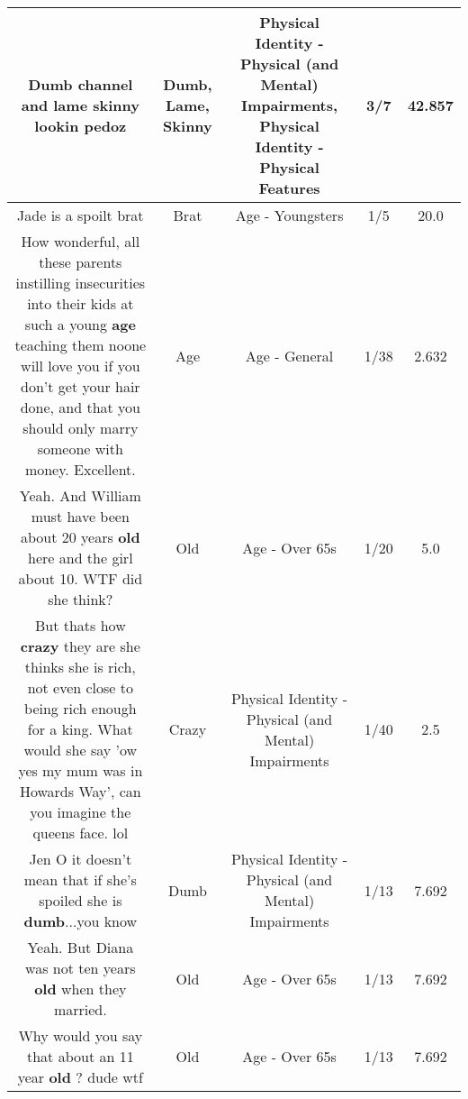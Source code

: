 \documentclass[11pt]{article}
\newlength\mylength
\begin{document}
\begin{center}
\begin{longtable}{|C{.65\mylength}|C{.30\mylength}|C{.12\mylength}|C{.12\mylength}|C{.12\mylength}|}
  \small Dumb channel and \textbf{lame} \textbf{skinny} lookin pedoz\normalsize   & Dumb, Lame, Skinny & Physical Identity - Physical (and Mental) Impairments, Physical Identity - Physical Features & 3/7 & 42.857 \\  \hline
  \small Jade is a spoilt  brat\normalsize   & Brat & Age - Youngsters & 1/5 & 20.0 \\  \hline
  \small How wonderful, all these parents instilling insecurities into their kids at such a young \textbf{age} teaching them noone will love you if you don't get your hair done, and that you should only marry someone with money. Excellent.\normalsize   & Age & Age - General & 1/38 & 2.632 \\  \hline
  \small Yeah. And William must have been about 20 years \textbf{old} here and the girl about 10. WTF did she think?\normalsize   & Old & Age - Over 65s & 1/20 & 5.0 \\  \hline
  \small But thats how \textbf{crazy} they are she thinks she is rich, not even close to being rich enough for a king. What would she say 'ow yes my mum was in Howards Way', can you imagine the queens face. lol\normalsize   & Crazy & Physical Identity - Physical (and Mental) Impairments & 1/40 & 2.5 \\  \hline
  \small Jen O it doesn't mean that if she's spoiled she is \textbf{dumb}...you know\normalsize   & Dumb & Physical Identity - Physical (and Mental) Impairments & 1/13 & 7.692 \\  \hline
  \small {} Yeah. But Diana was not ten years \textbf{old} when they married.\normalsize   & Old & Age - Over 65s & 1/13 & 7.692 \\  \hline
  \small Why would you say that about an 11 year \textbf{old} ? dude wtf\normalsize   & Old & Age - Over 65s & 1/13 & 7.692 \\  \hline

\end{longtable}
\end{center}
\end{document}
